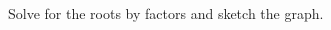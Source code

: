 \documentclass[12pt, a4paper, addpoints]{exam}
\begin{document}
\begin{questions}
\begin{multicols}{2}
\end{multicols}


\newpage






\question Solve for the roots by factors  and sketch the graph. 

\setlength{\columnsep}{70pt}
\begin{multicols}{2}

\end{multicols}
\end{questions}
\end{document}
